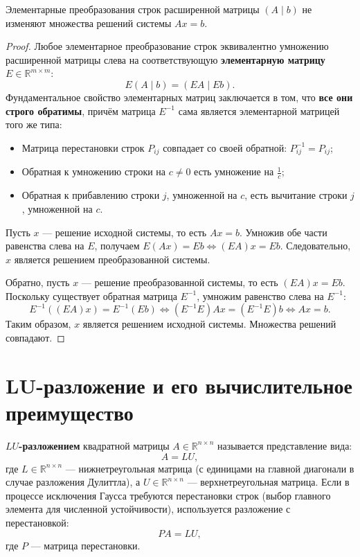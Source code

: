 \begin{theorem}
Элементарные преобразования строк расширенной матрицы $(A \mid b)$ не изменяют множества решений системы $Ax = b$.
\end{theorem}
\begin{proof}
    Любое элементарное преобразование строк эквивалентно умножению расширенной матрицы слева на соответствующую
    \textbf{элементарную матрицу} $E \in \mathbb{R}^{m \times m}$:
    \[ E(A \mid b) = (EA \mid Eb). \]
    Фундаментальное свойство элементарных матриц заключается в том, что \textbf{все они строго обратимы},
    причём матрица $E^{-1}$ сама является элементарной матрицей того же типа:
    \begin{itemize}
        \item Матрица перестановки строк $P_{ij}$ совпадает со своей обратной: $P_{ij}^{-1} = P_{ij}$;
        \item Обратная к умножению строки на $c \ne 0$ есть умножение на $\frac{1}{c}$;
        \item Обратная к прибавлению строки $j$, умноженной на $c$, есть вычитание строки $j$, умноженной на $c$.
    \end{itemize}
    Пусть $x$ — решение исходной системы, то есть $Ax = b$.
    Умножив обе части равенства слева на $E$, получаем $E(Ax) = Eb \iff (EA)x = Eb$.
    Следовательно, $x$ является решением преобразованной системы.
    
    Обратно, пусть $x$ — решение преобразованной системы, то есть $(EA)x = Eb$.
    Поскольку существует обратная матрица $E^{-1}$, умножим равенство слева на $E^{-1}$:
    \[ E^{-1}((EA)x) = E^{-1}(Eb) \iff (E^{-1}E)Ax = (E^{-1}E)b \iff Ax = b. \]
    Таким образом, $x$ является решением исходной системы.
    Множества решений совпадают.
\end{proof}

\section{LU-разложение и его вычислительное преимущество}

\begin{definition}[LU-decomposition]
\textbf{$LU$-разложением} квадратной матрицы $A \in \mathbb{R}^{n \times n}$ называется представление вида:
\[ A = L U, \]
где $L \in \mathbb{R}^{n \times n}$ — нижнетреугольная матрица (с единицами на главной диагонали в случае разложения
Дулиттла), а $U \in \mathbb{R}^{n \times n}$ — верхнетреугольная матрица.
Если в процессе исключения Гаусса требуются перестановки строк (выбор главного элемента для численной устойчивости),
используется разложение с перестановкой:
\[ P A = L U, \]
где $P$ — матрица перестановки.
\end{definition}

